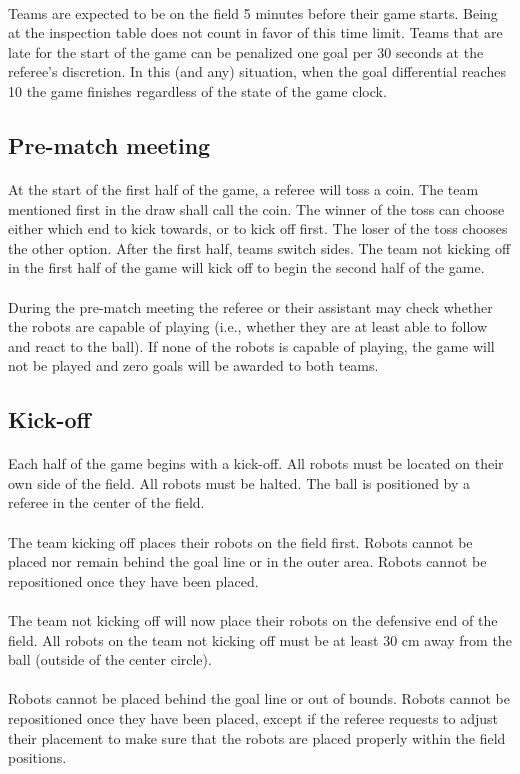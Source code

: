 \documentclass{article}
\newcommand*{\p}{\paragraph{}}
\begin{document}
\p Teams are expected to be on the field 5 minutes before their game
starts. Being at the inspection table does not count in favor of this time
limit. Teams that are late for the start of the game can be penalized one goal per
30 seconds at the referee's discretion. In this (and any) situation, when the goal
differential reaches 10 the game finishes regardless of the state of the game clock.

\subsection{Pre-match meeting \label{ref-003}}

\p At the start of the first half of the game, a referee will toss a coin. The
team mentioned first in the draw shall call the coin. The winner of the toss
can choose either which end to kick towards, or to kick off first. The loser of the
toss chooses the other option. After the first half, teams switch sides.
The team not kicking off in the first half of the game will kick off to
begin the second half of the game.

\p During the pre-match meeting the referee or their assistant may
check whether the robots are capable of playing (i.e., whether they are at
least able to follow and react to the ball). If none of the robots is capable
of playing, the game will not be played and zero goals will be awarded to both
teams.

\subsection{Kick-off \label{ref-004}}

\p Each half of the game begins with a kick-off. All robots must be located on
their own side of the field. All robots must be halted. The ball is positioned
by a referee in the center of the field.

\p The team kicking off places their robots on the field first. Robots cannot be
placed nor remain behind the goal line or in the outer area. Robots cannot be
repositioned once they have been placed.

\p The team not kicking off will now place their robots on the defensive end of
the field. All robots on the team not kicking off must be at least 30 cm away
from the ball (outside of the center circle).

\p Robots cannot be placed behind the goal line or out of bounds.
Robots cannot be repositioned once they have been placed, except if the referee
requests to adjust their placement to make sure that the robots are placed
properly within the field positions.
\end{document}
